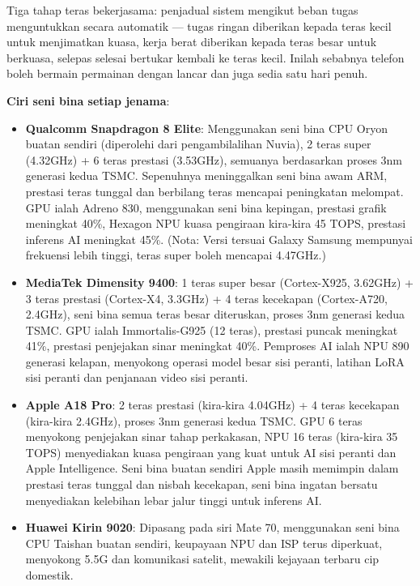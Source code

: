 Tiga tahap teras bekerjasama: penjadual sistem mengikut beban tugas menguntukkan secara automatik — tugas ringan diberikan kepada teras kecil untuk menjimatkan kuasa, kerja berat diberikan kepada teras besar untuk berkuasa, selepas selesai bertukar kembali ke teras kecil. Inilah sebabnya telefon boleh bermain permainan dengan lancar dan juga sedia satu hari penuh.

\textbf{Ciri seni bina setiap jenama}:

\begin{itemize}
  \item \textbf{Qualcomm Snapdragon 8 Elite}: Menggunakan seni bina CPU Oryon buatan sendiri (diperolehi dari pengambilalihan Nuvia), 2 teras super (4.32GHz) + 6 teras prestasi (3.53GHz), semuanya berdasarkan proses 3nm generasi kedua TSMC. Sepenuhnya meninggalkan seni bina awam ARM, prestasi teras tunggal dan berbilang teras mencapai peningkatan melompat. GPU ialah Adreno 830, menggunakan seni bina kepingan, prestasi grafik meningkat 40\%, Hexagon NPU kuasa pengiraan kira-kira 45 TOPS, prestasi inferens AI meningkat 45\%. (Nota: Versi tersuai Galaxy Samsung mempunyai frekuensi lebih tinggi, teras super boleh mencapai 4.47GHz.)
  \item \textbf{MediaTek Dimensity 9400}: 1 teras super besar (Cortex-X925, 3.62GHz) + 3 teras prestasi (Cortex-X4, 3.3GHz) + 4 teras kecekapan (Cortex-A720, 2.4GHz), seni bina semua teras besar diteruskan, proses 3nm generasi kedua TSMC. GPU ialah Immortalis-G925 (12 teras), prestasi puncak meningkat 41\%, prestasi penjejakan sinar meningkat 40\%. Pemproses AI ialah NPU 890 generasi kelapan, menyokong operasi model besar sisi peranti, latihan LoRA sisi peranti dan penjanaan video sisi peranti.
  \item \textbf{Apple A18 Pro}: 2 teras prestasi (kira-kira 4.04GHz) + 4 teras kecekapan (kira-kira 2.4GHz), proses 3nm generasi kedua TSMC. GPU 6 teras menyokong penjejakan sinar tahap perkakasan, NPU 16 teras (kira-kira 35 TOPS) menyediakan kuasa pengiraan yang kuat untuk AI sisi peranti dan Apple Intelligence. Seni bina buatan sendiri Apple masih memimpin dalam prestasi teras tunggal dan nisbah kecekapan, seni bina ingatan bersatu menyediakan kelebihan lebar jalur tinggi untuk inferens AI.
  \item \textbf{Huawei Kirin 9020}: Dipasang pada siri Mate 70, menggunakan seni bina CPU Taishan buatan sendiri, keupayaan NPU dan ISP terus diperkuat, menyokong 5.5G dan komunikasi satelit, mewakili kejayaan terbaru cip domestik.
\end{itemize}

